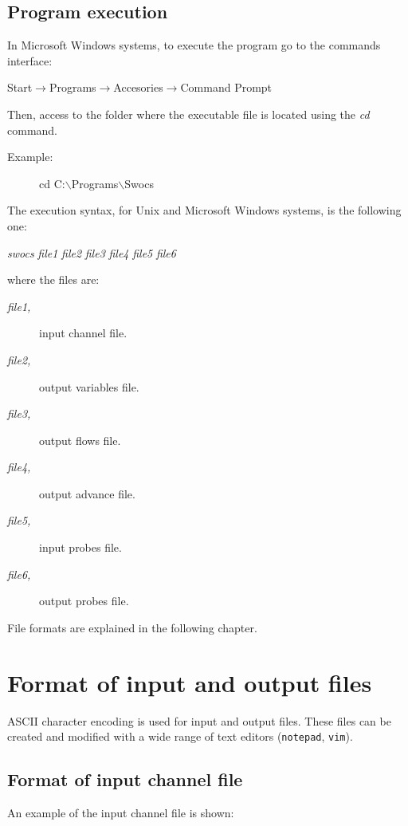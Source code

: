 \documentclass[a4paper,12pt]{report}
\begin{document}
\section{Program execution}

In Microsoft Windows systems, to execute the program go to the commands interface:
\begin{description}
\item[Start$\rightarrow$Programs$\rightarrow$Accesories$\rightarrow$Command Prompt]
\end{description}
Then, access to the folder where the executable file is located using the \emph{cd} command.
\begin{description}
\item[Example:] cd C:$\backslash$Programs$\backslash$Swocs
\end{description}

The execution syntax, for Unix and Microsoft Windows systems, is the following one:
\begin{description}
\item \emph{swocs}  \emph{file1} \emph{file2} \emph{file3} \emph{file4} \emph{file5} \emph{file6}
\end{description}
where the files are:
\begin{description}
\item[\it file1,] input channel file.
\item[\it file2,] output variables file.
\item[\it file3,] output flows file.
\item[\it file4,] output advance file.
\item[\it file5,] input probes file.
\item[\it file6,] output probes file.
\end{description}

File formats are explained in the following chapter.

\chapter{Format of input and output files}

ASCII character encoding is used for input and output files. These files can be created and modified
with a wide range of text editors ({\tt notepad}, {\tt vim}). 


\section{Format of input channel file}
An example of the input channel file is shown:
\end{document}
